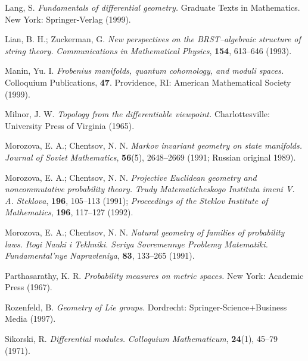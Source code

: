 \begin{thebibliography}{9}
 Lang, S. \textit{Fundamentals of differential geometry.} Graduate Texts in Mathematics. New York: Springer-Verlag (1999).

 Lian, B. H.; Zuckerman, G. \textit{New perspectives on the BRST--algebraic structure of string theory.} \textit{Communications in Mathematical Physics}, \textbf{154}, 613--646 (1993).

 Manin, Yu. I. \textit{Frobenius manifolds, quantum cohomology, and moduli spaces.} Colloquium Publications, \textbf{47}. Providence, RI: American Mathematical Society (1999).

 Milnor, J. W. \textit{Topology from the differentiable viewpoint.} Charlottesville: University Press of Virginia (1965).

 Morozova, E. A.; Chentsov, N. N. \textit{Markov invariant geometry on state manifolds.} \textit{Journal of Soviet Mathematics}, \textbf{56}(5), 2648--2669 (1991; Russian original 1989).

 Morozova, E. A.; Chentsov, N. N. \textit{Projective Euclidean geometry and noncommutative probability theory.} \textit{Trudy Matematicheskogo Instituta imeni V. A. Steklova}, \textbf{196}, 105--113 (1991); \textit{Proceedings of the Steklov Institute of Mathematics}, \textbf{196}, 117--127 (1992).

 Morozova, E. A.; Chentsov, N. N. \textit{Natural geometry of families of probability laws.} \textit{Itogi Nauki i Tekhniki. Seriya Sovremennye Problemy Matematiki. Fundamental'nye Napravleniya}, \textbf{83}, 133--265 (1991).

 Parthasarathy, K. R. \textit{Probability measures on metric spaces.} New York: Academic Press (1967).

 Rozenfeld, B. \textit{Geometry of Lie groups.} Dordrecht: Springer-Science+Business Media (1997).

 Sikorski, R. \textit{Differential modules.} \textit{Colloquium Mathematicum}, \textbf{24}(1), 45--79 (1971).

\end{thebibliography}

